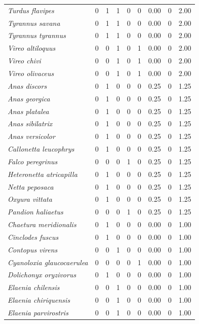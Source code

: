 \documentclass[
  oneside]{scrbook}
\begin{document}
\begin{longtable}{>{}lrrrrrrrr}
\em{Turdus flavipes} & 0 & 1 & 1 & 0 & 0 & 0.00 & 0 & 2.00\\
\em{Tyrannus savana} & 0 & 1 & 1 & 0 & 0 & 0.00 & 0 & 2.00\\
\em{Tyrannus tyrannus} & 0 & 1 & 1 & 0 & 0 & 0.00 & 0 & 2.00\\
\em{Vireo altiloquus} & 0 & 0 & 1 & 0 & 1 & 0.00 & 0 & 2.00\\
\addlinespace
\em{Vireo chivi} & 0 & 0 & 1 & 0 & 1 & 0.00 & 0 & 2.00\\
\em{Vireo olivaceus} & 0 & 0 & 1 & 0 & 1 & 0.00 & 0 & 2.00\\
\em{Anas discors} & 0 & 1 & 0 & 0 & 0 & 0.25 & 0 & 1.25\\
\em{Anas georgica} & 0 & 1 & 0 & 0 & 0 & 0.25 & 0 & 1.25\\
\em{Anas platalea} & 0 & 1 & 0 & 0 & 0 & 0.25 & 0 & 1.25\\
\addlinespace
\em{Anas sibilatrix} & 0 & 1 & 0 & 0 & 0 & 0.25 & 0 & 1.25\\
\em{Anas versicolor} & 0 & 1 & 0 & 0 & 0 & 0.25 & 0 & 1.25\\
\em{Callonetta leucophrys} & 0 & 1 & 0 & 0 & 0 & 0.25 & 0 & 1.25\\
\em{Falco peregrinus} & 0 & 0 & 0 & 1 & 0 & 0.25 & 0 & 1.25\\
\em{Heteronetta atricapilla} & 0 & 1 & 0 & 0 & 0 & 0.25 & 0 & 1.25\\
\addlinespace
\em{Netta peposaca} & 0 & 1 & 0 & 0 & 0 & 0.25 & 0 & 1.25\\
\em{Oxyura vittata} & 0 & 1 & 0 & 0 & 0 & 0.25 & 0 & 1.25\\
\em{Pandion haliaetus} & 0 & 0 & 0 & 1 & 0 & 0.25 & 0 & 1.25\\
\em{Chaetura meridionalis} & 0 & 1 & 0 & 0 & 0 & 0.00 & 0 & 1.00\\
\em{Cinclodes fuscus} & 0 & 1 & 0 & 0 & 0 & 0.00 & 0 & 1.00\\
\addlinespace
\em{Contopus virens} & 0 & 0 & 1 & 0 & 0 & 0.00 & 0 & 1.00\\
\em{Cyanoloxia glaucocaerulea} & 0 & 0 & 0 & 0 & 1 & 0.00 & 0 & 1.00\\
\em{Dolichonyx oryzivorus} & 0 & 1 & 0 & 0 & 0 & 0.00 & 0 & 1.00\\
\em{Elaenia chilensis} & 0 & 0 & 1 & 0 & 0 & 0.00 & 0 & 1.00\\
\em{Elaenia chiriquensis} & 0 & 0 & 1 & 0 & 0 & 0.00 & 0 & 1.00\\
\addlinespace
\em{Elaenia parvirostris} & 0 & 0 & 1 & 0 & 0 & 0.00 & 0 & 1.00\\

\end{longtable}
\end{document}
